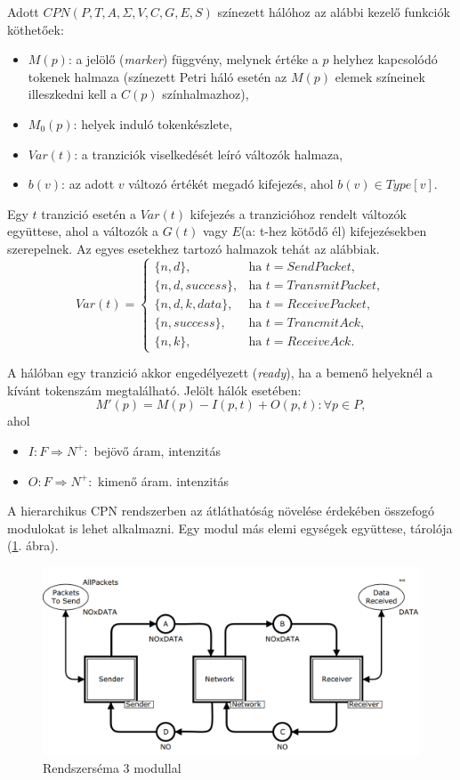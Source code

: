 Adott $CPN(P, T, A, \Sigma, V, C, G, E, S)$ színezett hálóhoz az alábbi kezelő funkciók köthetőek: 
\begin{itemize}
\item $M(p)$: a jelölő (\textit{marker}) függvény, melynek értéke a $p$ helyhez kapcsolódó tokenek halmaza (színezett Petri háló esetén az $M(p)$ elemek színeinek illeszkedni kell a $C(p)$ színhalmazhoz),
\item $M_0(p)$: helyek induló tokenkészlete,
\item $Var(t)$: a tranziciók viselkedését leíró változók halmaza,
\item $b(v)$: az adott $v$ változó értékét megadó kifejezés, ahol $b(v) \in Type[v]$.
\end{itemize}

Egy $t$ tranzició esetén a $Var(t)$ kifejezés a tranzicióhoz rendelt változók együttese, ahol a változók a $G(t)$ vagy $E$(a: t-hez kötődő él) kifejezésekben szerepelnek.
Az egyes esetekhez tartozó halmazok tehát az alábbiak.
\begin{equation*}
Var(t)=\begin{cases}
\{n,d\}, &\text{ha } t=SendPacket, \\
\{n,d,success\}, &\text{ha } t= TransmitPacket, \\
\{n,d,k,data\}, &\text{ha } t=ReceivePacket, \\
\{n,success\}, &\text{ha } t=TrancmitAck, \\
\{n,k\}, &\text{ha }t=ReceiveAck.
\end{cases}
\end{equation*}

A hálóban egy tranzició akkor engedélyezett (\textit{ready}), ha a bemenő helyeknél a kívánt tokenszám megtalálható.
Jelölt hálók esetében:
\[
M'(p)=M(p)-I(p,t)+O(p,t): \forall p\in P,
\]
ahol 
\begin{itemize}
\item $I:F\Rightarrow N^+:$  bejövő áram, intenzitás
\item $O:F\Rightarrow N^+:$ kimenő áram. intenzitás
\end{itemize}

A hierarchikus CPN rendszerben az átláthatóság növelése érdekében összefogó modulokat is lehet alkalmazni. Egy modul más elemi egységek együttese, tárolója (\ref{fig:schema}. ábra).

\begin{figure}[h!]
\centering
\includegraphics[scale=0.5]{images/rendszersema3modul.png}
\caption{Rendszerséma 3 modullal}
\label{fig:schema}
\end{figure}


